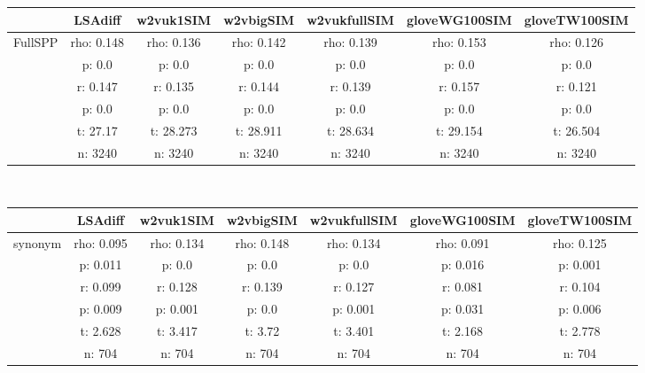 \documentclass{article}
\begin{document}
\begin{tabular}{ccccccc|}\cline{2-7}
&\multicolumn{1}{|c}{LSAdiff} & w2vuk1SIM & w2vbigSIM & w2vukfullSIM & gloveWG100SIM & gloveTW100SIM \\\hline
\multicolumn{1}{|c|}{\multirow{6}{*}{FullSPP}} & rho: 0.148 & rho: 0.136 & rho: 0.142 & rho: 0.139 & rho: 0.153 & rho: 0.126 \\
\multicolumn{1}{|c|}{} & p: 0.0 & p: 0.0 & p: 0.0 & p: 0.0 & p: 0.0 & p: 0.0 \\
\multicolumn{1}{|c|}{} & r: 0.147 & r: 0.135 & r: 0.144 & r: 0.139 & r: 0.157 & r: 0.121 \\
\multicolumn{1}{|c|}{} & p: 0.0 & p: 0.0 & p: 0.0 & p: 0.0 & p: 0.0 & p: 0.0 \\
\multicolumn{1}{|c|}{} & t: 27.17 & t: 28.273 & t: 28.911 & t: 28.634 & t: 29.154 & t: 26.504 \\
\multicolumn{1}{|c|}{} & n: 3240 & n: 3240 & n: 3240 & n: 3240 & n: 3240 & n: 3240 \\
\hline
\end{tabular}\\
\begin{tabular}{ccccccc|}\cline{2-7}
&\multicolumn{1}{|c}{LSAdiff} & w2vuk1SIM & w2vbigSIM & w2vukfullSIM & gloveWG100SIM & gloveTW100SIM \\\hline
\multicolumn{1}{|c|}{\multirow{6}{*}{synonym}} & rho: 0.095 & rho: 0.134 & rho: 0.148 & rho: 0.134 & rho: 0.091 & rho: 0.125 \\
\multicolumn{1}{|c|}{} & p: 0.011 & p: 0.0 & p: 0.0 & p: 0.0 & p: 0.016 & p: 0.001 \\
\multicolumn{1}{|c|}{} & r: 0.099 & r: 0.128 & r: 0.139 & r: 0.127 & r: 0.081 & r: 0.104 \\
\multicolumn{1}{|c|}{} & p: 0.009 & p: 0.001 & p: 0.0 & p: 0.001 & p: 0.031 & p: 0.006 \\
\multicolumn{1}{|c|}{} & t: 2.628 & t: 3.417 & t: 3.72 & t: 3.401 & t: 2.168 & t: 2.778 \\
\multicolumn{1}{|c|}{} & n: 704 & n: 704 & n: 704 & n: 704 & n: 704 & n: 704 \\
\hline
\end{tabular}\\
\end{document}

